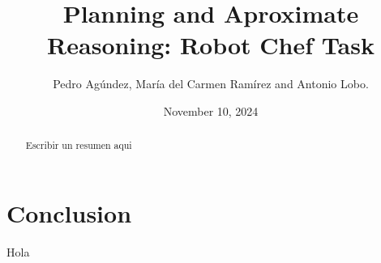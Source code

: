 \documentclass{article}
\title{Planning and Aproximate Reasoning: Robot Chef Task}
\author{
	Pedro Agúndez, María del Carmen Ramírez and Antonio Lobo.
}
\date{November 10, 2024}
\begin{document}
	
	\maketitle

\begin{abstract}
Escribir un resumen aqui
\end{abstract}

 

 


\section{Conclusion}
Hola\cite{key}



\end{document}
